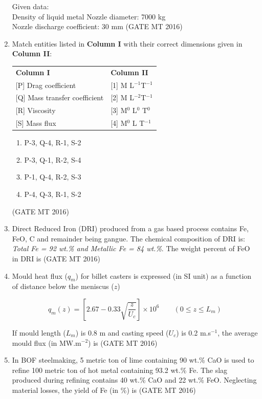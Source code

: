\documentclass[11pt, letterpaper]{article}
\theoremstyle{remark}
\begin{document}
\begin{enumerate}
    Given data:\\
    Density of liquid metal Nozzle diameter: 7000 kg \\
    Nozzle discharge coefficient: 30 mm
\hfill(GATE MT 2016)

\item Match entities listed in \textbf{Column I} with their correct dimensions given in \textbf{Column II}:

\begin{tabular}{ll}
\textbf{Column I} & \textbf{Column II} \\
{[P]} Drag coefficient & {[1]} M L$^{-1}$T$^{-1}$ \\
{[Q]} Mass transfer coefficient & {[2]} M L$^{-2}$T$^{-1}$ \\
{[R]} Viscosity & {[3]} M$^0$ L$^0$ T$^0$ \\
{[S]} Mass flux & {[4]} M$^0$ L T$^{-1}$ \\
\end{tabular}

\begin{enumerate}
\item P-3, Q-4, R-1, S-2
\item P-3, Q-1, R-2, S-4
\item P-1, Q-4, R-2, S-3
\item P-4, Q-3, R-1, S-2
\end{enumerate}
\hfill(GATE MT 2016)

\item Direct Reduced Iron (DRI) produced from a gas based process contains Fe, FeO, C and remainder being gangue. The chemical composition of DRI is: \textit{Total Fe = 92 wt.\% and Metallic Fe = 84 wt.\%}. The weight percent of FeO in DRI is 
\hfill(GATE MT 2016)

\item Mould heat flux ($q_m$) for billet casters is expressed (in SI unit) as a function of distance below the meniscus ($z$)

$$q_m(z) = \left[ 2.67 - 0.33 \sqrt{\frac{z}{U_c}} \right] \times 10^6 \qquad (0 \leq z \leq L_m)$$

If mould length ($L_m$) is 0.8 m and casting speed ($U_c$) is 0.2 m.s$^{-1}$, the average mould flux (in MW.m$^{-2}$) is 
\hfill(GATE MT 2016)

\item In BOF steelmaking, 5 metric ton of lime containing 90 wt.\% CaO is used to refine 100 metric ton of hot metal containing 93.2 wt.\% Fe. The slag produced during refining contains 40 wt.\% CaO and 22 wt.\% FeO. Neglecting material losses, the yield of Fe (in \%) is
\hfill(GATE MT 2016)


\end{enumerate}
\end{document}
